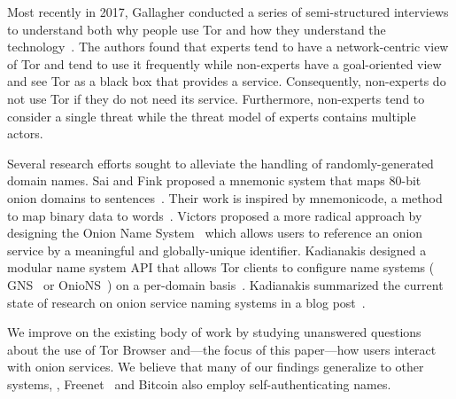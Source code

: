 Most recently in 2017, Gallagher \ea conducted a series of semi-structured
interviews to understand both why people use Tor and how they understand the
technology~\cite{Gallagher2017a}.  The authors found that experts tend to have a
network-centric view of Tor and tend to use it frequently while non-experts have
a goal-oriented view and see Tor as a black box that provides a service.
Consequently, non-experts do not use Tor if they do not need its service.
Furthermore, non-experts tend to consider a single threat while the threat model
of experts contains multiple actors.

Several research efforts sought to alleviate the handling of randomly-generated
domain names.  Sai and Fink proposed a mnemonic system that maps 80-bit onion
domains to sentences~\cite{Sai2012a}.  Their work is inspired by mnemonicode, a
method to map binary data to words~\cite{mnemonicode}.  Victors \ea proposed a
more radical approach by designing the Onion Name System~\cite{Victors2017a}
which allows users to reference an onion service by a meaningful and
globally-unique identifier.  Kadianakis \ea designed a modular name system API
that allows Tor clients to configure name systems (\eg
GNS~\cite{Schanzenbach2012a} or OnioNS~\cite{Victors2017a}) on a per-domain
basis~\cite{Kadianakis2016a}.  Kadianakis summarized the current state of
research on onion service naming systems in a blog post~\cite{Kadianakis2017a}.

We improve on the existing body of work by studying unanswered questions about
the use of Tor Browser and---the focus of this paper---how users interact with
onion services.  We believe that many of our findings generalize to other
systems, \eg, Freenet~\cite{Freenet} and Bitcoin also employ self-authenticating
names.
